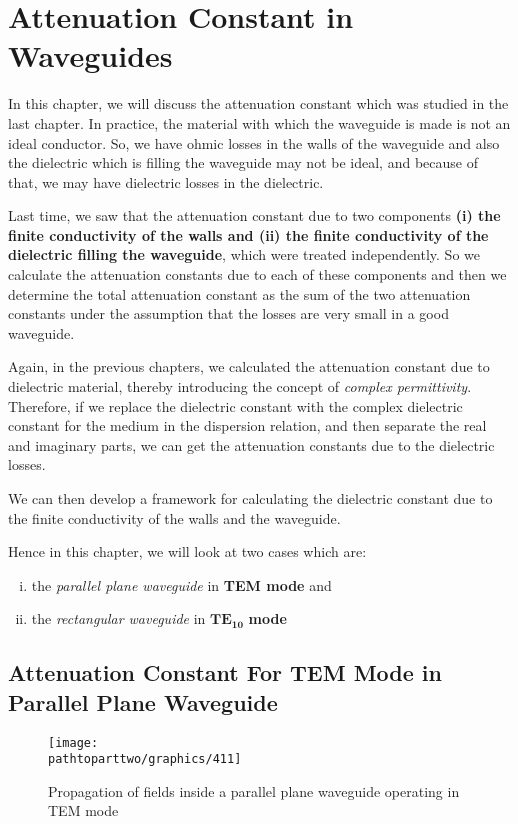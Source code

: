 \chapter{Attenuation Constant in Waveguides}\label{lec:lec42}
In this chapter, we will discuss the attenuation constant which was studied in the last chapter. In practice, the material with which the waveguide is made is not an ideal conductor. So, we have ohmic losses in the walls of the waveguide and also the dielectric which is filling the waveguide may not be ideal, and because of that, we may have dielectric losses in the dielectric.

Last time, we saw that the attenuation constant due to two components \textbf{(i) the finite conductivity of the walls and (ii) the finite conductivity of the dielectric filling the waveguide}, which were treated independently. So we calculate the attenuation constants due to each of these components and then we determine the total attenuation constant as the sum of the two attenuation constants under the assumption that the losses are very small in a good waveguide.

Again, in the previous chapters, we calculated the attenuation constant due to dielectric material, thereby introducing the concept of \emph{complex permittivity}. Therefore, if we replace the dielectric constant with the complex dielectric constant for the medium in the dispersion relation, and then separate the real and imaginary parts, we can get the attenuation constants due to the dielectric losses.

We can then develop a framework for calculating the dielectric constant due to the finite conductivity of the walls and the waveguide.

Hence in this chapter, we will look at two cases which are:
\begin{enumerate}[(i)]
\item the \emph{parallel plane waveguide} in \textbf{TEM mode} and
\item the \emph{rectangular waveguide} in $\boldsymbol{TE_{10}}$ \textbf{mode}
\end{enumerate}

\section{Attenuation Constant For TEM Mode in Parallel Plane Waveguide}
\begin{figure}[h]
\centering
\texttt{[image: \\pathtoparttwo/graphics/411]}
\caption{Propagation of fields inside a parallel plane waveguide operating in TEM mode}
\label{fig:elcture2imageb}
\end{figure}

